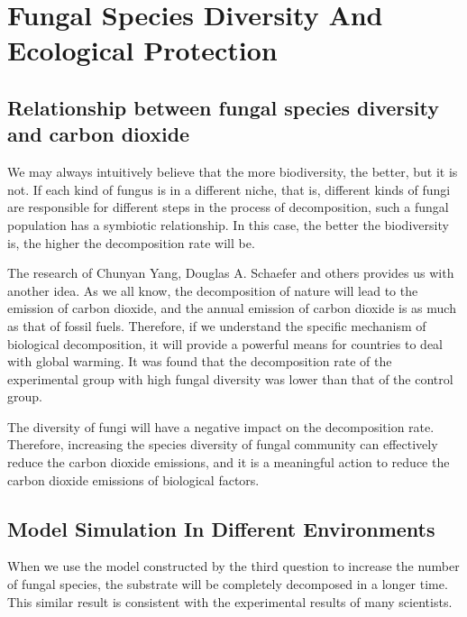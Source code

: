 \documentclass[12pt]{article}
\begin{document}

\section{Fungal Species Diversity And Ecological Protection}

\subsection{Relationship between fungal species diversity and carbon dioxide}
We may always intuitively believe that the more biodiversity, the better, but it is not. If each kind of fungus is in a different niche, that is, different kinds of fungi are responsible for different steps in the process of decomposition, such a fungal population has a symbiotic relationship. In this case, the better the biodiversity is, the higher the decomposition rate will be.\par 

The research of Chunyan Yang, Douglas A. Schaefer and others provides us with another idea. As we all know, the decomposition of nature will lead to the emission of carbon dioxide, and the annual emission of carbon dioxide is as much as that of fossil fuels. Therefore, if we understand the specific mechanism of biological decomposition, it will provide a powerful means for countries to deal with global warming. It was found that the decomposition rate of the experimental group with high fungal diversity was lower than that of the control group\cite{5,6,7}.\par 

The diversity of fungi will have a negative impact on the decomposition rate. Therefore, increasing the species diversity of fungal community can effectively reduce the carbon dioxide emissions, and it is a meaningful action to reduce the carbon dioxide emissions of biological factors.\par 

\subsection{Model Simulation In Different Environments}

When we use the model constructed by the third question to increase the number of fungal species, the substrate will be completely decomposed in a longer time. This similar result is consistent with the experimental results of many scientists.\par 
\end{document}
